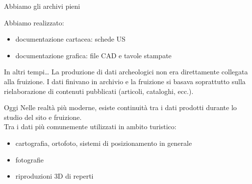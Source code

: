 \documentclass{beamer}
\begin{document}
        {
            \begin{frame}{Abbiamo gli archivi pieni}
                \colorbox{yellow!20}{
                    \begin{minipage}[t]{\paperwidth}
                        Abbiamo realizzato:
                        \begin{itemize}
                            \item documentazione cartacea: schede US
                            \item documentazione grafica: file CAD e tavole stampate
                        \end{itemize}
                    \end{minipage}
                }
            \end{frame}
        }

        \begin{frame}{In altri tempi\ldots}
            La produzione di dati archeologici non era direttamente collegata alla fruizione. I dati finivano in archivio e la fruizione si basava soprattutto sulla rielaborazione di contenuti pubblicati (articoli, cataloghi, ecc.).
        \end{frame}

        \begin{frame}{Oggi}
            Nelle realtà più moderne, esiste continuità tra i dati prodotti durante lo studio del sito e fruizione.\\
            Tra i dati più comunemente utilizzati in ambito turistico:
            \begin{itemize}
                \item cartografia, ortofoto, sistemi di posizionamento in generale
                \item fotografie
                \item riproduzioni 3D di reperti
            \end{itemize}
        \end{frame}
\end{document}
